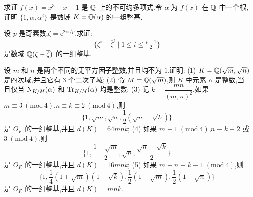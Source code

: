 \begin{Exercises}
  \item 求证 $f(x)=x^3-x-1$ 是 $\mathbb{Q}$ 上的不可约多项式.令 $\alpha$ 为 $f(x)$ 在 $\mathbb{Q}$ 中一个根,证明 $\{1,\alpha,\alpha^2\}$ 是数域 $K=\mathbb{Q}(\alpha)$ 的一组整基.
  \item 设 $p$ 是奇素数,$\zeta=\mathrm{e}^{2\pi\mathrm{i}/p}$.求证:
        \[
          \{\zeta^i+\overline{\zeta}^i\mid 1\leqslant i\leqslant\tfrac{p-1}{2}\}
        \]
        是数域 $\mathbb{Q}(\zeta+\overline{\zeta})$ 的一组整基.
  \item 设 $m$ 和 $n$ 是两个不同的无平方因子整数,并且均不为 $1$,证明:
        (1) $K=\mathbb{Q}(\sqrt{m},\sqrt{n})$ 是四次域,并且它有 $3$ 个二次子域;
        (2) 令 $M=\mathbb{Q}(\sqrt{m})$,则 $K$ 中元素 $\alpha$ 是整数,当且仅当 $\mathrm{N}_{K/M}(\alpha)$ 和 $\mathrm{Tr}_{K/M}(\alpha)$ 均是整数;
        (3) 记 $k=\dfrac{mn}{(m,n)^2}$.如果 $m\equiv 3\ (\mathrm{mod}\ 4)$,$n\equiv k\equiv 2\ (\mathrm{mod}\ 4)$,则
        \[
          \Big\{1,\sqrt{m},\sqrt{n},\frac{1}{2}(\sqrt{n}+\sqrt{k})\Big\}
        \]
        是 $O_K$ 的一组整基,并且 $d(K)=64mnk$;
        (4) 如果 $m\equiv 1\ (\mathrm{mod}\ 4)$,$n\equiv k\equiv 2$ 或 $3\ (\mathrm{mod}\ 4)$,则
        \[
          \Big\{1,\frac{1+\sqrt{m}}{2},\sqrt{n},\frac{\sqrt{n}+\sqrt{k}}{2}\Big\}
        \]
        是 $O_K$ 的一组整基,并且 $d(K)=16mnk$;
        (5) 如果 $m\equiv n\equiv k\equiv 1\ (\mathrm{mod}\ 4)$,则
        \[
          \Big\{1,\frac{1}{4}(1+\sqrt{m})(1+\sqrt{k}),\frac{1}{2}(1+\sqrt{m}),\frac{1}{2}(1+\sqrt{n})\Big\}
        \]
        是 $O_K$ 的一组整基,并且 $d(K)=mnk$.
\end{Exercises}
